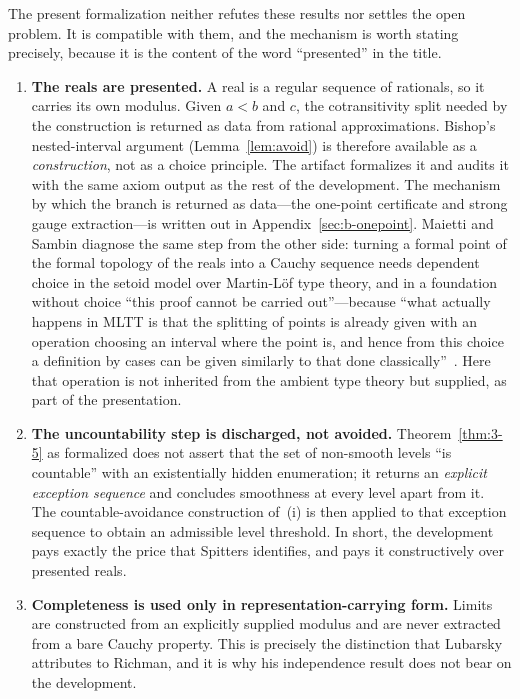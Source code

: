 \documentclass[11pt]{article}
\theoremstyle{definition}
\theoremstyle{remark}
\begin{document}
The present formalization neither refutes these results nor settles the open problem.  It is compatible with them, and the mechanism is worth stating precisely, because it is the content of the word ``presented'' in the title.

\begin{enumerate}[label=(\roman*)]
\item \textbf{The reals are presented.}  A real is a regular sequence of rationals, so it carries its own modulus.  Given \(a<b\) and \(c\), the cotransitivity split needed by the construction is returned as data from rational approximations.  Bishop's nested-interval argument (Lemma~\ref{lem:avoid}) is therefore available as a \emph{construction}, not as a choice principle.  The artifact formalizes it and audits it with the same axiom output as the rest of the development.  The mechanism by which the branch is returned as data---the one-point certificate and strong gauge extraction---is written out in Appendix~\ref{sec:b-onepoint}.  Maietti and Sambin diagnose the same step from the other side: turning a formal point of the formal topology of the reals into a Cauchy sequence needs dependent choice in the setoid model over Martin-L\"of type theory, and in a foundation without choice ``this proof cannot be carried out''---because ``what actually happens in MLTT is that the splitting of points is already given with an operation choosing an interval where the point is, and hence from this choice a definition by cases can be given similarly to that done classically''~\cite[\S20.4.3]{maietti-sambin-2023}.  Here that operation is not inherited from the ambient type theory but supplied, as part of the presentation.

\item \textbf{The uncountability step is discharged, not avoided.}  Theorem~\ref{thm:3-5} as formalized does not assert that the set of non-smooth levels ``is countable'' with an existentially hidden enumeration; it returns an \emph{explicit exception sequence} and concludes smoothness at every level apart from it.  The countable-avoidance construction of~(i) is then applied to that exception sequence to obtain an admissible level threshold.  In short, the development pays exactly the price that Spitters identifies, and pays it constructively over presented reals.

\item \textbf{Completeness is used only in representation-carrying form.}  Limits are constructed from an explicitly supplied modulus and are never extracted from a bare Cauchy property.  This is precisely the distinction that Lubarsky attributes to Richman, and it is why his independence result does not bear on the development.


\end{enumerate}
\end{document}
